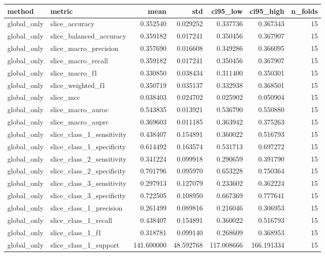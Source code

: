 \begin{tabular}{llrrrrr}
\toprule
method & metric & mean & std & ci95_low & ci95_high & n_folds \\
\midrule
global_only & slice_accuracy & 0.352540 & 0.029252 & 0.337736 & 0.367343 & 15 \\
global_only & slice_balanced_accuracy & 0.359182 & 0.017241 & 0.350456 & 0.367907 & 15 \\
global_only & slice_macro_precision & 0.357690 & 0.016608 & 0.349286 & 0.366095 & 15 \\
global_only & slice_macro_recall & 0.359182 & 0.017241 & 0.350456 & 0.367907 & 15 \\
global_only & slice_macro_f1 & 0.330850 & 0.038434 & 0.311400 & 0.350301 & 15 \\
global_only & slice_weighted_f1 & 0.350719 & 0.035137 & 0.332938 & 0.368501 & 15 \\
global_only & slice_mcc & 0.038403 & 0.024702 & 0.025902 & 0.050904 & 15 \\
global_only & slice_macro_auroc & 0.543835 & 0.013921 & 0.536790 & 0.550880 & 15 \\
global_only & slice_macro_auprc & 0.369603 & 0.011185 & 0.363942 & 0.375263 & 15 \\
global_only & slice_class_1_sensitivity & 0.438407 & 0.154891 & 0.360022 & 0.516793 & 15 \\
global_only & slice_class_1_specificity & 0.614492 & 0.163574 & 0.531713 & 0.697272 & 15 \\
global_only & slice_class_2_sensitivity & 0.341224 & 0.099918 & 0.290659 & 0.391790 & 15 \\
global_only & slice_class_2_specificity & 0.701796 & 0.095970 & 0.653228 & 0.750364 & 15 \\
global_only & slice_class_3_sensitivity & 0.297913 & 0.127079 & 0.233602 & 0.362224 & 15 \\
global_only & slice_class_3_specificity & 0.722505 & 0.108950 & 0.667369 & 0.777641 & 15 \\
global_only & slice_class_1_precision & 0.261499 & 0.089816 & 0.216046 & 0.306953 & 15 \\
global_only & slice_class_1_recall & 0.438407 & 0.154891 & 0.360022 & 0.516793 & 15 \\
global_only & slice_class_1_f1 & 0.318781 & 0.099140 & 0.268609 & 0.368953 & 15 \\
global_only & slice_class_1_support & 141.600000 & 48.592768 & 117.008666 & 166.191334 & 15 \\

\end{tabular}
